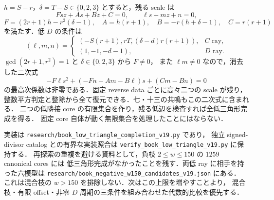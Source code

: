 $h=S-r$，$\delta=T-S\in\{0,2,3\}$ とすると，残る scale は
\[
 Fsz+As+Bz+C=0,\qquad \ell s+mz+n=0,
\]
\[
 F=(2r+1)h-r^2(\delta-1),\quad
 A=h(r+1),\quad B=-r(h+\delta-1),\quad C=r(r+1)
\]
を満たす．低 $D$ の条件は
\[
 (\ell,m,n)=
 \begin{cases}
 (-S(r+1),rT,(\delta-d)r(r+1)),&C\text{ ray},\\
 (1,-1,-d-1),&D\text{ ray}.
 \end{cases}
\]
$\gcd(2r+1,r^2)=1$ と $\delta\in\{0,2,3\}$ から $F\ne0$，
また $\ell m\ne0$ なので，消去した二次式
\[
 -F\ell s^2+(-Fn+Am-B\ell)s+(Cm-Bn)=0
\]
の最高次係数は非零である．固定 reverse data ごとに高々二つの scale が残り，
整数平方判定と整除から全て復元できる．七・十三の共鳴もこの二次式に含まれる．
二つの低隣接 core の有限集合を作り，残る低辺を検査すれば全低三角形完成を得る．
固定 core 自体が動く無限集合を処理したことにはならない．

実装は \nolinkurl{research/book_low_triangle_completion_v19.py} であり，
独立 signed-divisor catalog との有界な実装照合は
\nolinkurl{verify_book_low_triangle_v19.py} に保持する．
再探索の重複を避ける資料として，負枝 $2\le w\le150$ の $1259$ canonical cores には
低三角形完成がなかったことを残す．両低 ray に相手を持った六模型は
\nolinkurl{research/book_negative_w150_candidates_v19.json} にある．
これは混合枝の $w>150$ を排除しない．次はこの上限を増やすことより，
混合枝・有限 offset・非零 $D$ 周期の三条件を組み合わせた代数的比較を優先する．

